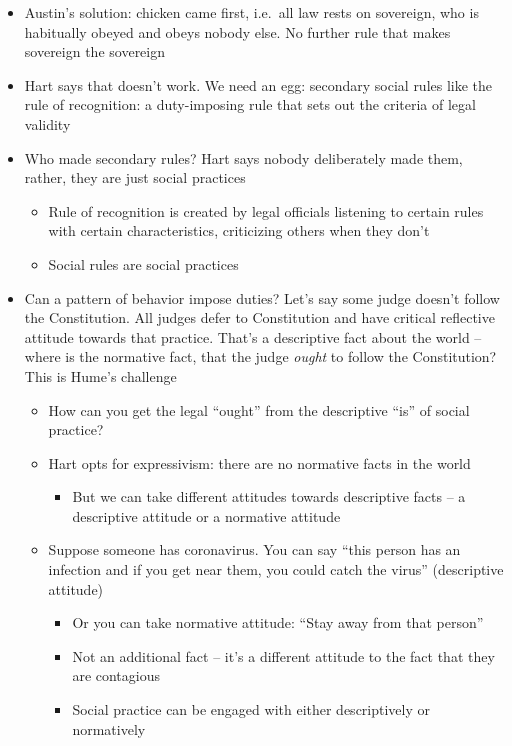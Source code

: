 \begin{itemize}
\tightlist
\item
  Austin's solution: chicken came first, i.e.~all law rests on
  sovereign, who is habitually obeyed and obeys nobody else. No further
  rule that makes sovereign the sovereign
\item
  Hart says that doesn't work. We need an egg: secondary social rules
  like the rule of recognition: a duty-imposing rule that sets out the
  criteria of legal validity
\item
  Who made secondary rules? Hart says nobody deliberately made them,
  rather, they are just social practices

  \begin{itemize}
  \tightlist
  \item
    Rule of recognition is created by legal officials listening to
    certain rules with certain characteristics, criticizing others when
    they don't
  \item
    Social rules are social practices
  \end{itemize}
\item
  Can a pattern of behavior impose duties? Let's say some judge doesn't
  follow the Constitution. All judges defer to Constitution and have
  critical reflective attitude towards that practice. That's a
  descriptive fact about the world -- where is the normative fact, that
  the judge \emph{ought} to follow the Constitution? This is Hume's
  challenge

  \begin{itemize}
  \tightlist
  \item
    How can you get the legal ``ought'' from the descriptive ``is'' of
    social practice?
  \item
    Hart opts for expressivism: there are no normative facts in the
    world

    \begin{itemize}
    \tightlist
    \item
      But we can take different attitudes towards descriptive facts -- a
      descriptive attitude or a normative attitude
    \end{itemize}
  \item
    Suppose someone has coronavirus. You can say ``this person has an
    infection and if you get near them, you could catch the virus''
    (descriptive attitude)

    \begin{itemize}
    \tightlist
    \item
      Or you can take normative attitude: ``Stay away from that person''
    \item
      Not an additional fact -- it's a different attitude to the fact
      that they are contagious
    \item
      Social practice can be engaged with either descriptively or
      normatively


\end{itemize}
\end{itemize}
\end{itemize}
